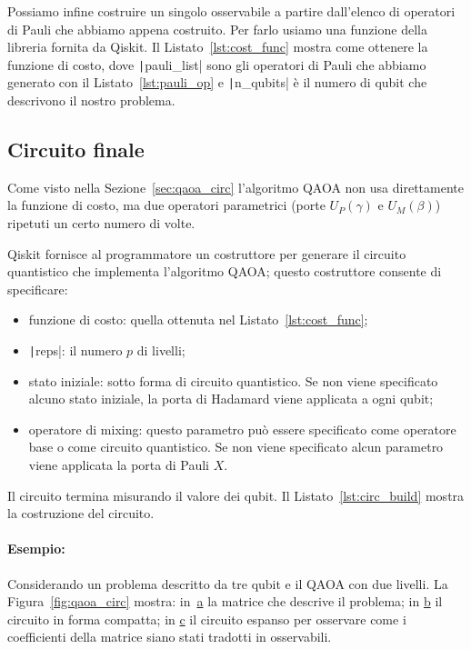 Possiamo infine costruire un singolo osservabile a partire dall'elenco di operatori di Pauli che abbiamo appena costruito. Per farlo usiamo una funzione della libreria fornita da Qiskit. Il Listato~\ref{lst:cost_func} mostra come ottenere la funzione di costo, dove \texttt|pauli_list| sono gli operatori di Pauli che abbiamo generato con il Listato~\ref{lst:pauli_op} e \texttt|n_qubits| è il numero di qubit che descrivono il nostro problema.
\begin{listingenv}[h]
	\caption{Definizione della funzione di costo}
	\label{lst:cost_func}
\end{listingenv}
\subsection{Circuito finale}
Come visto nella Sezione~\ref{sec:qaoa_circ} l'algoritmo QAOA non usa direttamente la funzione di costo, ma due operatori parametrici (porte $U_P(\gamma)$ e $U_M(\beta)$) ripetuti un certo numero di volte. 

Qiskit fornisce al programmatore un costruttore per generare il circuito quantistico che implementa l'algoritmo QAOA; questo costruttore consente di specificare:
\begin{itemize}
	\item funzione di costo: quella ottenuta nel Listato~\ref{lst:cost_func};
	\item \texttt|reps|: il numero $p$ di livelli;
	\item stato iniziale: sotto forma di circuito quantistico. Se non viene specificato alcuno stato iniziale, la porta di Hadamard viene applicata a ogni qubit;
	\item operatore di mixing: questo parametro può essere specificato come operatore base o come circuito quantistico. Se non viene specificato alcun parametro viene applicata la porta di Pauli $X$.
\end{itemize}

Il circuito termina misurando il valore dei qubit. Il Listato~\ref{lst:circ_build} mostra la costruzione del circuito.

\begin{listingenv}[h]
	\caption{Costruzione del circuito}
	\label{lst:circ_build}
\end{listingenv}

\paragraph{Esempio:} Considerando un problema descritto da tre qubit e il QAOA con due livelli. La Figura~\ref{fig:qaoa_circ} mostra: in~\hyperref[fig:cost_mat]{a} la matrice che descrive il problema; in \hyperref[fig:qaoa_1]{b} il circuito in forma compatta; in \hyperref[fig:qaoa_2]{c} il circuito espanso per osservare come i coefficienti della matrice siano stati tradotti in osservabili.

